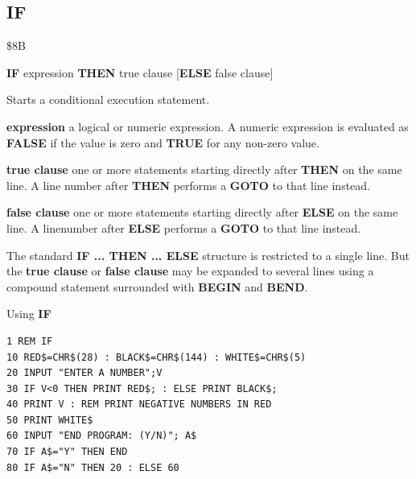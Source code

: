 \subsection{IF}
\begin{description}[leftmargin=2cm,style=nextline]
\item [Token:] \$8B
\item [Format:] {\bf IF} expression {\bf THEN} true clause
		[{\bf ELSE} false clause]
\item [Usage:] Starts a conditional execution
               statement.

                {\bf expression} a logical or numeric expression.
                A numeric expression is evaluated as {\bf FALSE}
                if the value is zero and {\bf TRUE} for any non-zero
                value.

                {\bf true clause} one or more statements starting
                directly after {\bf THEN} on the same line.
                A line number after {\bf THEN} performs a
                {\bf GOTO} to that line instead.

                {\bf false clause} one or more statements starting
                directly after {\bf ELSE} on the same line.
                A linenumber after {\bf ELSE} performs a
                {\bf GOTO} to that line instead.

\item [Remarks:]
               The standard {\bf IF ... THEN ... ELSE} structure
               is restricted to a single line. But the {\bf true clause}
               or {\bf false clause} may be expanded to several lines
               using a compound statement surrounded with
               {\bf BEGIN} and {\bf BEND}.
\item [Example:]
                Using {\bf IF}
\begin{tcolorbox}[colback=black,coltext=white]
\verbatimfont{\codefont}
\begin{verbatim}
1 REM IF
10 RED$=CHR$(28) : BLACK$=CHR$(144) : WHITE$=CHR$(5)
20 INPUT "ENTER A NUMBER";V
30 IF V<0 THEN PRINT RED$; : ELSE PRINT BLACK$;
40 PRINT V : REM PRINT NEGATIVE NUMBERS IN RED
50 PRINT WHITE$
60 INPUT "END PROGRAM: (Y/N)"; A$
70 IF A$="Y" THEN END
80 IF A$="N" THEN 20 : ELSE 60
\end{verbatim}
\end{tcolorbox}
\end{description}



